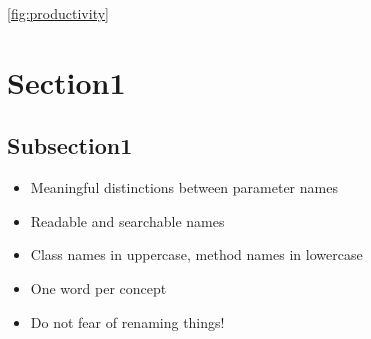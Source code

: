 \documentclass[conference]{IEEEtran}
\begin{document}
\cite[S.7]{martin2009clean}

\ref{fig:productivity}

\section{Section1}

\subsection{Subsection1}

\begin{itemize}
    \item Meaningful distinctions between parameter names
    \item Readable and searchable names
    \item Class names in uppercase, method names in lowercase
    \item One word per concept
    \item Do not fear of renaming things!
\end{itemize}


 
\end{document}
